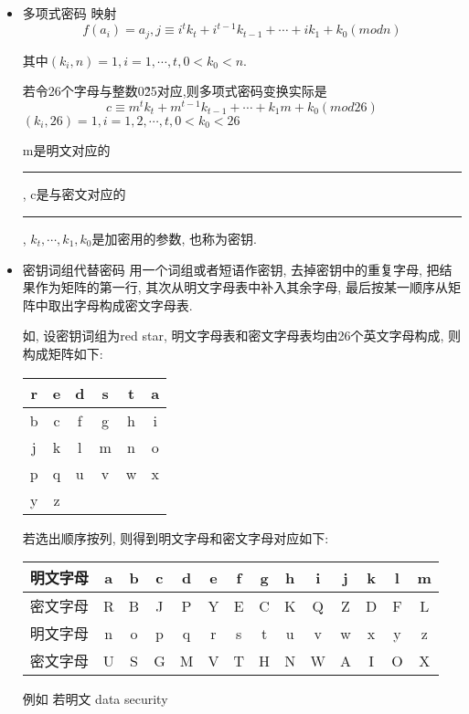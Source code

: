\documentclass[UTF8]{ctexart}
\newcommand\hl{\bgroup\markoverwith
  {\textcolor{yellow}{\rule[-.5ex]{2pt}{2.5ex}}}\ULon}
\begin{document}
\begin{itemize}
        \item 多项式密码
        映射
        $$f(a_i)=a_j, j\equiv i^tk_t + i^{t-1}k_{t-1} + \cdots + ik_1 + k_0(mod n)$$

        其中$(k_i, n)=1, i=1,\cdots, t, 0<k_0<n$.

        若令26个字母与整数0\~{25}对应,则多项式密码变换实际是
        $$c\equiv m^tk_t + m^{t-1}k_{t-1} + \cdots + k_1m + k_0(mod 26)$$
        $(k_i, 26)=1, i=1, 2, \cdots, t, 0<k_0<26$

        m是明文对应的\hl{明文数据}, c是与密文对应的\hl{密文数据}, $k_t, \cdots, k_1, k_0$是加密用的参数, 也称为密钥.

        \item 密钥词组代替密码
        用一个词组或者短语作密钥, 去掉密钥中的重复字母, 把结果作为矩阵的第一行, 其次从明文字母表中补入其余字母, 最后按某一顺序从矩阵中取出字母构成密文字母表.

        如, 设密钥词组为red star, 明文字母表和密文字母表均由26个英文字母构成, 则构成矩阵如下:

        \begin{tabular}{|c|c|c|c|c|c|}
            \hline
            r& e& d& s& t& a\\
            \hline
            b& c& f& g& h& i\\
            \hline
            j& k& l& m& n& o\\
            \hline
            p& q& u& v& w& x\\
            \hline
            y& z&  &  &  &\\
            \hline
        \end{tabular}

        若选出顺序按列, 则得到明文字母和密文字母对应如下:

        \begin{tabular}{|c|c|c|c|c|c|c|c|c|c|c|c|c|c|}
            \hline
            明文字母& a& b& c& d& e& f& g& h& i& j& k& l& m\\
            \hline
            密文字母& R& B& J& P& Y& E& C& K& Q& Z& D& F& L\\
            \hline
            \hline
            明文字母& n& o& p& q& r& s& t& u& v& w& x& y& z\\
            \hline
            密文字母& U& S& G& M& V& T& H& N& W& A& I& O& X\\
            \hline
        \end{tabular}

        例如 若明文 data security


\end{itemize}
\end{document}
